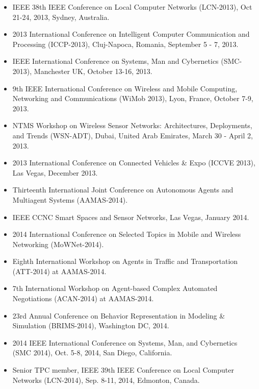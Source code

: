 \begin{itemize}
\item IEEE 38th IEEE Conference on Local Computer Networks (LCN-2013), Oct 21-24, 2013, Sydney, Australia.

\item 2013 International Conference on Intelligent
Computer Communication and Processing (ICCP-2013), Cluj-Napoca, Romania, September 5 - 7, 2013.

\item IEEE International Conference on Systems, Man and Cybernetics (SMC-2013), Manchester UK, October 13-16, 2013.

\item 9th IEEE International Conference on Wireless and Mobile Computing, Networking and Communications (WiMob 2013), Lyon, France, October 7-9, 2013.

\item NTMS Workshop on Wireless Sensor Networks: Architectures, Deployments, and Trends (WSN-ADT), Dubai, United Arab Emirates, March 30 - April 2, 2013.

\item 2013 International Conference on Connected Vehicles \& Expo (ICCVE 2013), Las Vegas, December 2013.

\item Thirteenth International Joint Conference on Autonomous Agents and Multiagent Systems (AAMAS-2014).

\item IEEE CCNC Smart Spaces and Sensor Networks, Las Vegas, January 2014.

\item 2014 International Conference on Selected Topics in Mobile and Wireless Networking (MoWNet-2014).

\item Eighth International Workshop on Agents in Traffic and Transportation (ATT-2014) at AAMAS-2014.

\item 7th International Workshop on Agent-based Complex Automated Negotiations (ACAN-2014) at AAMAS-2014.

\item 23rd Annual Conference on Behavior Representation in Modeling \& Simulation (BRIMS-2014), Washington DC, 2014.

\item 2014 IEEE International Conference on Systems, Man, and Cybernetics (SMC 2014),  Oct. 5-8, 2014, San Diego, California.

\item Senior TPC member, IEEE 39th IEEE Conference on Local Computer Networks (LCN-2014), Sep. 8-11, 2014, Edmonton, Canada.


\end{itemize}
